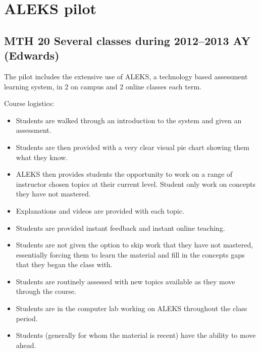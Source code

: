 \chapter{ALEKS pilot}\label{app:sec:aleks}
\section{MTH 20 Several classes during 2012--2013 AY (Edwards)}

The pilot includes the extensive use of ALEKS, a technology based assessment learning system,  in 2 on campus and 2 online classes each term.  

Course logistics: 
\begin{itemize}
    \item Students are walked through an introduction to the system and given
      an assessment.
    \item Students are then provided with a very clear visual pie chart showing
      them what they know.
    \item ALEKS then provides students the opportunity to work on a range of
      instructor chosen topics at their current level.  Student only work on concepts they have not mastered.
    \item Explanations and videos are provided with each topic.
    \item Students are provided instant feedback and instant online teaching.
    \item Students are not given the option to skip work that they have not
      mastered, essentially forcing them to learn the material and 
	fill in the concepts gaps that they began the class with.
    \item Students are routinely assessed with new topics available as they
      move through the course.
    \item Students are in the computer lab working on ALEKS throughout the
      class period.
    \item Students (generally for whom the material is recent) have the
      ability to move ahead.  
\end{itemize}

